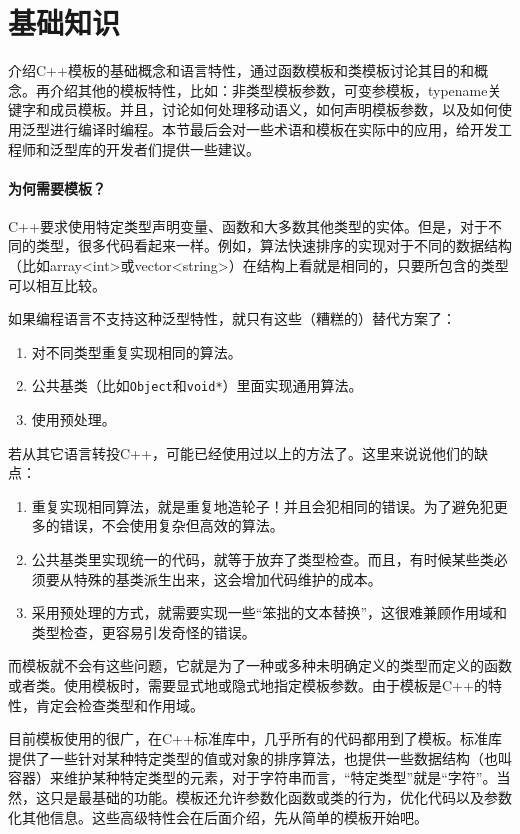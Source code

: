 \part{基础知识}

介绍C++模板的基础概念和语言特性，通过函数模板和类模板讨论其目的和概念。再介绍其他的模板特性，比如：非类型模板参数，可变参模板，typename关键字和成员模板。并且，讨论如何处理移动语义，如何声明模板参数，以及如何使用泛型进行编译时编程。本节最后会对一些术语和模板在实际中的应用，给开发工程师和泛型库的开发者们提供一些建议。

\subsection*{为何需要模板？}

C++要求使用特定类型声明变量、函数和大多数其他类型的实体。但是，对于不同的类型，很多代码看起来一样。例如，算法快速排序的实现对于不同的数据结构（比如array<int>或vector<string>）在结构上看就是相同的，只要所包含的类型可以相互比较。

如果编程语言不支持这种泛型特性，就只有这些（糟糕的）替代方案了：

\begin{enumerate}
  \item 对不同类型重复实现相同的算法。
  \item 公共基类（比如\texttt{Object}和\texttt{void*}）里面实现通用算法。
  \item 使用预处理。
\end{enumerate}

若从其它语言转投C++，可能已经使用过以上的方法了。这里来说说他们的缺点：

\begin{enumerate}
  \item 重复实现相同算法，就是重复地造轮子！并且会犯相同的错误。为了避免犯更多的错误，不会使用复杂但高效的算法。

  \item 公共基类里实现统一的代码，就等于放弃了类型检查。而且，有时候某些类必须要从特殊的基类派生出来，这会增加代码维护的成本。

  \item 采用预处理的方式，就需要实现一些“笨拙的文本替换”，这很难兼顾作用域和类型检查，更容易引发奇怪的错误。
\end{enumerate}

而模板就不会有这些问题，它就是为了一种或多种未明确定义的类型而定义的函数或者类。使用模板时，需要显式地或隐式地指定模板参数。由于模板是C++的特性，肯定会检查类型和作用域。

目前模板使用的很广，在C++标准库中，几乎所有的代码都用到了模板。标准库提供了一些针对某种特定类型的值或对象的排序算法，也提供一些数据结构（也叫容器）来维护某种特定类型的元素，对于字符串而言，“特定类型”就是“字符”。当然，这只是最基础的功能。模板还允许参数化函数或类的行为，优化代码以及参数化其他信息。这些高级特性会在后面介绍，先从简单的模板开始吧。












